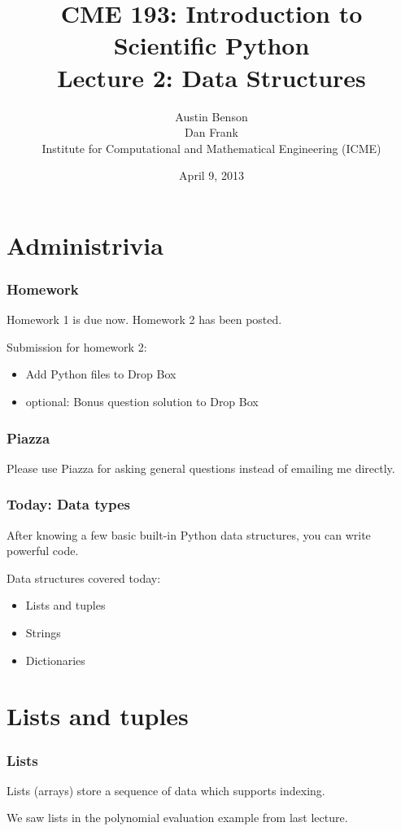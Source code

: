 \documentclass{beamer}
\title{CME 193: Introduction to Scientific Python \\
Lecture 2: Data Structures}
\author{Austin Benson \\
\vspace{0.1in}
Dan Frank \\
\vspace{0.1in}
Institute for Computational and Mathematical Engineering (ICME)}
\date{April 9, 2013}
\begin{document}
\maketitle

\section{Administrivia}
\begin{frame}
\frametitle{Homework}
Homework 1 is due now.  Homework 2 has been posted.

\vspace{0.2in}
Submission for homework 2:
\begin{itemize}
\setlength{\itemsep}{0.1in}
\item{Add Python files to Drop Box}
\item{optional: Bonus question solution to Drop Box}
\end{itemize}
\end{frame}

\begin{frame}
\frametitle{Piazza}
Please use Piazza for asking general questions instead of emailing me directly.
\end{frame}

\begin{frame}
\frametitle{Today: Data types}

After knowing a few basic built-in Python data structures, you can write powerful code.

\vspace{0.1in}

Data structures covered today:
\begin{itemize}
\setlength{\itemsep}{0.1in}
\item{Lists and tuples}
\item{Strings}
\item{Dictionaries}
\end{itemize}

\end{frame}

\section{Lists and tuples}

\begin{frame}
\frametitle{Lists}

Lists (arrays) store a sequence of data which supports indexing.

\vspace{0.1in}

We saw lists in the polynomial evaluation example from last lecture.

\end{frame}
\end{document}
